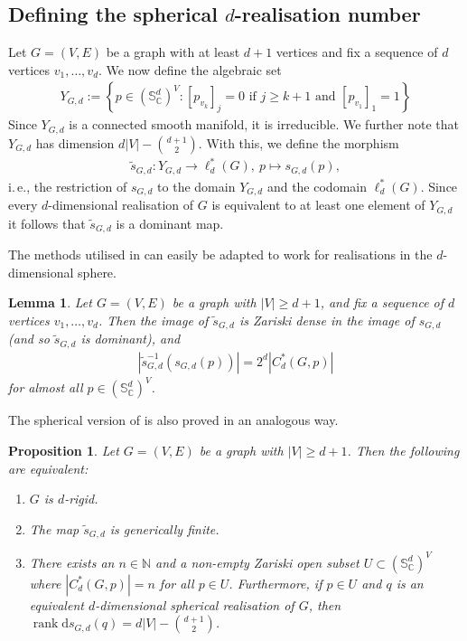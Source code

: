 \documentclass[11pt]{article}
\newtheorem{proposition}[theo]{Proposition}
\newtheorem{lemma}[theo]{Lemma}
\theoremstyle{definition}
\numberwithin{equation}{section}
\DeclareMathOperator{\rank}{rank}
\newcommand{\diff}{\mathrm{d}}
\begin{document}
\subsection{Defining the spherical \texorpdfstring{$d$-realisation}{d-realisation} number}

Let $G=(V,E)$ be a graph with at least $d+1$ vertices and fix a sequence of $d$ vertices $v_1,\ldots, v_d$.
We now define the algebraic set
\begin{align}\label{eq:yset}
	Y_{G,d} := \left\{ p \in (\mathbb{S}^{d}_\mathbb{C})^V : [p_{v_k}]_j=0 \text{ if } j \geq k + 1 \text{ and }  [p_{v_1}]_1=1 \right\}
\end{align}
Since $Y_{G,d}$ is a connected smooth manifold,
it is irreducible.
We further note that $Y_{G,d}$ has dimension $d|V| - \binom{d+1}{2}$.
With this, we define the morphism
\begin{align*}
	\tilde{s}_{G,d} : Y_{G,d} \rightarrow \ell^*_d(G), ~ p \mapsto s_{G,d}(p),
\end{align*}
i.\,e., the restriction of $s_{G,d}$ to the domain $Y_{G,d}$ and the codomain $\ell^*_d(G)$.
Since every $d$-dimensional realisation of $G$ is equivalent to at least one element of $Y_{G,d}$ it follows that $\tilde{s}_{G,d}$ is a dominant map.

The methods utilised in  can easily be adapted to work for realisations in the $d$-dimensional sphere.

\begin{lemma}\label{l:ygd}
	Let $G=(V,E)$ be a graph with $|V| \geq d+1$,
	and fix a sequence of $d$ vertices $v_1,\ldots, v_d$.
	Then the image of $\tilde{s}_{G,d}$ is Zariski dense in the image of $s_{G,d}$ (and so $\tilde{s}_{G,d}$ is dominant),
	and
	\begin{align*}
		\left|\tilde{s}_{G,d}^{-1}\left(s_{G,d}(p) \right) \right| = 2^{d} |C^*_d(G,p)|
	\end{align*}
	for almost all $p \in (\mathbb{S}_\mathbb{C}^d)^V$.
\end{lemma}


The spherical version of  is also proved in an analogous way.


\begin{proposition}\label{p:domsphere}
	Let $G=(V,E)$ be a graph with $|V| \geq d+1$.
	Then the following are equivalent:
	\begin{enumerate}
		\item\label{p:domsphere1} $G$ is $d$-rigid.
		\item\label{p:domsphere2} The map $\tilde{s}_{G,d}$ is generically finite.
		\item\label{p:domsphere3} There exists an $n \in \mathbb{N}$ and a non-empty Zariski open subset $U \subset (\mathbb{S}_\mathbb{C}^d)^V$ where $ |C^*_d(G,p)|=n$ for all $p \in U$.
		Furthermore,
		if $p \in U$ and $q$ is an equivalent $d$-dimensional spherical realisation of $G$,
		then $\rank \diff s_{G,d}(q) =  d|V| - \binom{d+1}{2}$.
	\end{enumerate}
\end{proposition} 
\end{document}
